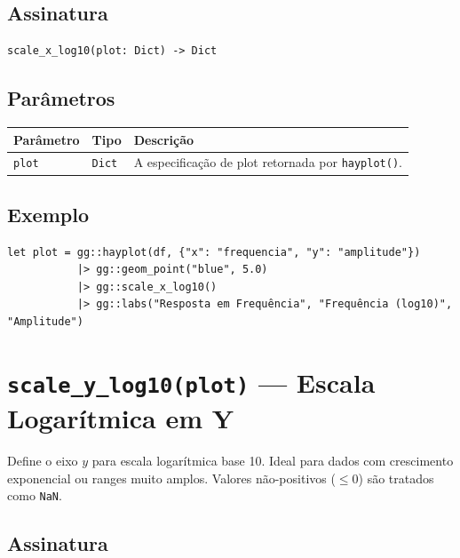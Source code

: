 \documentclass[12pt, a4paper, oneside]{book}
\newcommand{\code}[1]{\texttt{#1}}
\begin{document}
\subsection*{Assinatura}

\begin{lstlisting}[style=inline]
scale_x_log10(plot: Dict) -> Dict
\end{lstlisting}

\subsection*{Parâmetros}

\begin{tabularx}{\textwidth}{@{}lL{2.5cm}X@{}}
  \toprule
  \textbf{Parâmetro} & \textbf{Tipo} & \textbf{Descrição} \\
  \midrule
  \code{plot} & \code{Dict} & A especificação de plot retornada por \code{hayplot()}. \\
  \bottomrule
\end{tabularx}

\subsection*{Exemplo}

\begin{lstlisting}[caption={Eixo X em escala logarítmica}]
let plot = gg::hayplot(df, {"x": "frequencia", "y": "amplitude"})
           |> gg::geom_point("blue", 5.0)
           |> gg::scale_x_log10()
           |> gg::labs("Resposta em Frequência", "Frequência (log10)", "Amplitude")
\end{lstlisting}

\section{\texttt{scale\_y\_log10(plot)} --- Escala Logarítmica em Y}

Define o eixo $y$ para escala logarítmica base 10. Ideal para dados com crescimento exponencial
ou ranges muito amplos. Valores não-positivos ($\le 0$) são tratados como \texttt{NaN}.

\subsection*{Assinatura}
\end{document}
